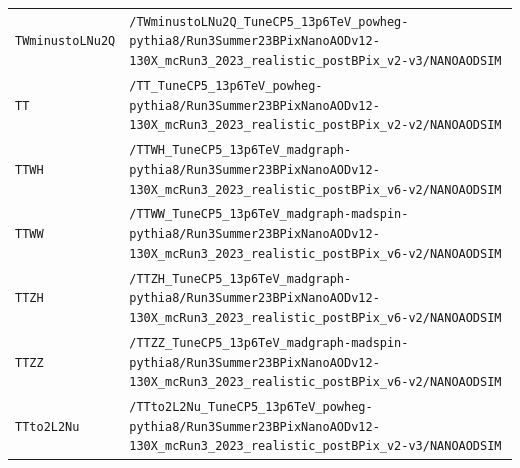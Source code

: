 \begin{longtable}{@{}>{\RaggedRight\arraybackslash}p{} >{\RaggedRight\arraybackslash}p{}@{}}
\addlinespace[2pt]
\texttt{TWminustoLNu2Q} & \texttt{/\allowbreak{}TWminustoLNu2Q\_\allowbreak{}TuneCP5\_\allowbreak{}13p6TeV\_\allowbreak{}powheg-\allowbreak{}pythia8/\allowbreak{}Run3Summer23BPixNanoAODv12-\allowbreak{}130X\_\allowbreak{}mcRun3\_\allowbreak{}2023\_\allowbreak{}realistic\_\allowbreak{}postBPix\_\allowbreak{}v2-\allowbreak{}v3/\allowbreak{}NANOAODSIM} \\
\addlinespace[2pt]
\texttt{TT} & \texttt{/\allowbreak{}TT\_\allowbreak{}TuneCP5\_\allowbreak{}13p6TeV\_\allowbreak{}powheg-\allowbreak{}pythia8/\allowbreak{}Run3Summer23BPixNanoAODv12-\allowbreak{}130X\_\allowbreak{}mcRun3\_\allowbreak{}2023\_\allowbreak{}realistic\_\allowbreak{}postBPix\_\allowbreak{}v2-\allowbreak{}v2/\allowbreak{}NANOAODSIM} \\
\addlinespace[2pt]
\texttt{TTWH} & \texttt{/\allowbreak{}TTWH\_\allowbreak{}TuneCP5\_\allowbreak{}13p6TeV\_\allowbreak{}madgraph-\allowbreak{}pythia8/\allowbreak{}Run3Summer23BPixNanoAODv12-\allowbreak{}130X\_\allowbreak{}mcRun3\_\allowbreak{}2023\_\allowbreak{}realistic\_\allowbreak{}postBPix\_\allowbreak{}v6-\allowbreak{}v2/\allowbreak{}NANOAODSIM} \\
\addlinespace[2pt]
\texttt{TTWW} & \texttt{/\allowbreak{}TTWW\_\allowbreak{}TuneCP5\_\allowbreak{}13p6TeV\_\allowbreak{}madgraph-\allowbreak{}madspin-\allowbreak{}pythia8/\allowbreak{}Run3Summer23BPixNanoAODv12-\allowbreak{}130X\_\allowbreak{}mcRun3\_\allowbreak{}2023\_\allowbreak{}realistic\_\allowbreak{}postBPix\_\allowbreak{}v6-\allowbreak{}v2/\allowbreak{}NANOAODSIM} \\
\addlinespace[2pt]
\texttt{TTZH} & \texttt{/\allowbreak{}TTZH\_\allowbreak{}TuneCP5\_\allowbreak{}13p6TeV\_\allowbreak{}madgraph-\allowbreak{}pythia8/\allowbreak{}Run3Summer23BPixNanoAODv12-\allowbreak{}130X\_\allowbreak{}mcRun3\_\allowbreak{}2023\_\allowbreak{}realistic\_\allowbreak{}postBPix\_\allowbreak{}v6-\allowbreak{}v2/\allowbreak{}NANOAODSIM} \\
\addlinespace[2pt]
\texttt{TTZZ} & \texttt{/\allowbreak{}TTZZ\_\allowbreak{}TuneCP5\_\allowbreak{}13p6TeV\_\allowbreak{}madgraph-\allowbreak{}madspin-\allowbreak{}pythia8/\allowbreak{}Run3Summer23BPixNanoAODv12-\allowbreak{}130X\_\allowbreak{}mcRun3\_\allowbreak{}2023\_\allowbreak{}realistic\_\allowbreak{}postBPix\_\allowbreak{}v6-\allowbreak{}v2/\allowbreak{}NANOAODSIM} \\
\addlinespace[2pt]
\texttt{TTto2L2Nu} & \texttt{/\allowbreak{}TTto2L2Nu\_\allowbreak{}TuneCP5\_\allowbreak{}13p6TeV\_\allowbreak{}powheg-\allowbreak{}pythia8/\allowbreak{}Run3Summer23BPixNanoAODv12-\allowbreak{}130X\_\allowbreak{}mcRun3\_\allowbreak{}2023\_\allowbreak{}realistic\_\allowbreak{}postBPix\_\allowbreak{}v2-\allowbreak{}v3/\allowbreak{}NANOAODSIM} \\

\end{longtable}
